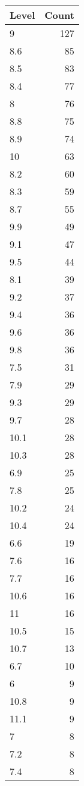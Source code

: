 \begin{table}[ht]
\centering
\begin{tabular}{lr}
  \hline
Level & Count \\ 
  \hline
9 & 127 \\ 
  8.6 &  85 \\ 
  8.5 &  83 \\ 
  8.4 &  77 \\ 
  8 &  76 \\ 
  8.8 &  75 \\ 
  8.9 &  74 \\ 
  10 &  63 \\ 
  8.2 &  60 \\ 
  8.3 &  59 \\ 
  8.7 &  55 \\ 
  9.9 &  49 \\ 
  9.1 &  47 \\ 
  9.5 &  44 \\ 
  8.1 &  39 \\ 
  9.2 &  37 \\ 
  9.4 &  36 \\ 
  9.6 &  36 \\ 
  9.8 &  36 \\ 
  7.5 &  31 \\ 
  7.9 &  29 \\ 
  9.3 &  29 \\ 
  9.7 &  28 \\ 
  10.1 &  28 \\ 
  10.3 &  28 \\ 
  6.9 &  25 \\ 
  7.8 &  25 \\ 
  10.2 &  24 \\ 
  10.4 &  24 \\ 
  6.6 &  19 \\ 
  7.6 &  16 \\ 
  7.7 &  16 \\ 
  10.6 &  16 \\ 
  11 &  16 \\ 
  10.5 &  15 \\ 
  10.7 &  13 \\ 
  6.7 &  10 \\ 
  6 &   9 \\ 
  10.8 &   9 \\ 
  11.1 &   9 \\ 
  7 &   8 \\ 
  7.2 &   8 \\ 
  7.4 &   8 \\ 

\end{tabular}
\end{table}
